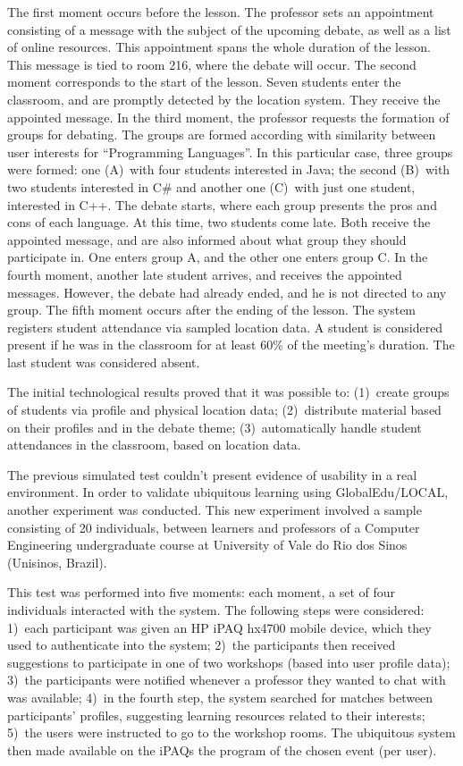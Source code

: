 \documentclass[5p,authoryear]{elsarticle}
\begin{document}
The first moment occurs before the lesson. The professor sets an appointment
consisting of a message with the subject of the upcoming debate, as well as a
list of online resources. This appointment spans the whole duration of the
lesson. This message is tied to room 216, where the debate will occur. The
second moment corresponds to the start of the lesson. Seven students enter the
classroom, and are promptly detected by the location system. They receive the
appointed message. In the third moment, the professor requests the formation of
groups for debating. The groups are formed according with similarity between
user interests for ``Programming Languages''. In this particular case, three
groups were formed: one (A)~with four students interested in Java; the second
(B)~with two students interested in C\# and another one (C)~with just one
student, interested in C++. The debate starts, where each group presents the
pros and cons of each language. At this time, two students come late. Both
receive the appointed message, and are also informed about what group they
should participate in. One enters group A, and the other one enters group C. In
the fourth moment, another late student arrives, and receives the appointed
messages. However, the debate had already ended, and he is not directed to any
group. The fifth moment occurs after the ending of the lesson. The system
registers student attendance via sampled location data. A student is considered
present if he was in the classroom for at least 60\% of the meeting's duration.
The last student was considered absent.

The initial technological results proved that it was possible to: (1)~create
groups of students via profile and physical location data; (2)~distribute
material based on their profiles and in the debate theme; (3)~automatically
handle student attendances in the classroom, based on location data.

The previous simulated test couldn't present evidence of usability in a real
environment. In order to validate ubiquitous learning using GlobalEdu/LOCAL,
another experiment was conducted. This new experiment involved a sample
consisting of 20 individuals, between learners and professors of a Computer
Engineering undergraduate course at University of Vale do Rio dos Sinos
(Unisinos, Brazil).

This test was performed into five moments: each moment, a set of four
individuals interacted with the system. The following steps were considered:
1)~each participant was given an HP iPAQ hx4700 mobile device, which they used
to authenticate into the system; 2)~the participants then received suggestions
to participate in one of two workshops (based into user profile data); 3)~the
participants were notified whenever a professor they wanted to chat with was
available; 4)~in the fourth step, the system searched for matches between
participants' profiles, suggesting learning resources related to their
interests; 5)~the users were instructed to go to the workshop rooms. The
ubiquitous system then made available on the iPAQs the program of the chosen
event (per user). 
\end{document}
